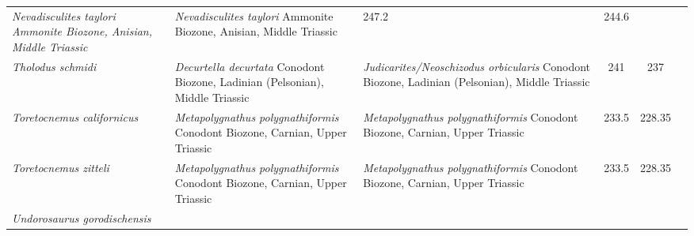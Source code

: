 \begin{longtabu}{>{\itshape}lXXSSl}
        \emph{Nevadisculites taylori} Ammonite Biozone, Anisian, Middle Triassic
                                                             &
        \emph{Nevadisculites taylori} Ammonite Biozone, Anisian, Middle Triassic
                                                             & 247.2
                                                             & 244.6
                                                             &
                                                             \cite{Frobisch2013PNAS} \\                   
	Tholodus schmidi                                     & \emph{Decurtella
        decurtata} Conodont Biozone, Ladinian (Pelsonian), Middle Triassic
                                                             &
            \emph{Judicarites/Neoschizodus orbicularis} Conodont Biozone,
            Ladinian (Pelsonian), Middle Triassic
                                                             & 241
                                                             & 237
                                                             &
                                                             \cite{DallaVecchia2004RIPES} \\               
	Toretocnemus californicus                            &
        \emph{Metapolygnathus polygnathiformis} Conodont Biozone, Carnian, Upper
        Triassic                                                  &
        \emph{Metapolygnathus polygnathiformis} Conodont Biozone, Carnian, Upper
        Triassic                                                  & 233.5
                                                                  & 228.35
                                                                  &
                                                                  \cite{Merriam1903UCBDG,McGowan2003HoP} \\        
	Toretocnemus zitteli                                 &
        \emph{Metapolygnathus polygnathiformis} Conodont Biozone, Carnian, Upper
        Triassic                                                  &
        \emph{Metapolygnathus polygnathiformis} Conodont Biozone, Carnian, Upper
        Triassic                                                  & 233.5
                                                                  & 228.35
                                                                  &
                                                                  \cite{Merriam1903UCBDG,McGowan2003HoP} \\        
	Undorosaurus gorodischensis                          &

\end{longtabu}
